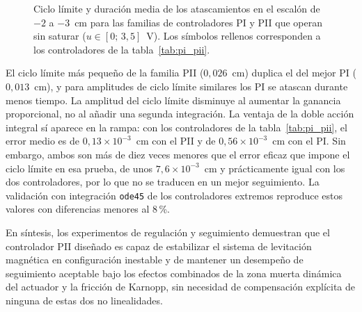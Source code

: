 \begin{figure}[ht]
    \centering
    
    \caption[Familias PI y PII]{Ciclo límite y duración media de los atascamientos en el escalón de $-2$ a $-3$~cm para las familias de controladores PI y PII que operan sin saturar ($u\in[0;\,3{,}5]$~V). Los símbolos rellenos corresponden a los controladores de la tabla~\ref{tab:pi_pii}.}
    \label{fig:r15_familias}
\end{figure}

El ciclo límite más pequeño de la familia PII ($0{,}026$~cm) duplica el del mejor PI ($0{,}013$~cm), y para amplitudes de ciclo límite similares los PI se atascan durante menos tiempo. La amplitud del ciclo límite disminuye al aumentar la ganancia proporcional, no al añadir una segunda integración. La ventaja de la doble acción integral sí aparece en la rampa: con los controladores de la tabla~\ref{tab:pi_pii}, el error medio es de $0{,}13\times10^{-3}$~cm con el PII y de $0{,}56\times10^{-3}$~cm con el PI. Sin embargo, ambos son más de diez veces menores que el error eficaz que impone el ciclo límite en esa prueba, de unos $7{,}6\times10^{-3}$~cm y prácticamente igual con los dos controladores, por lo que no se traducen en un mejor seguimiento. La validación con integración \texttt{ode45} de los controladores extremos reproduce estos valores con diferencias menores al 8\,\%.

En síntesis, los experimentos de regulación y seguimiento demuestran que el controlador PII
diseñado es capaz de estabilizar el sistema de levitación magnética en configuración inestable
y de mantener un desempeño de seguimiento aceptable bajo los efectos combinados de la
zona muerta dinámica del actuador y la fricción de Karnopp, sin necesidad de compensación
explícita de ninguna de estas dos no linealidades.
